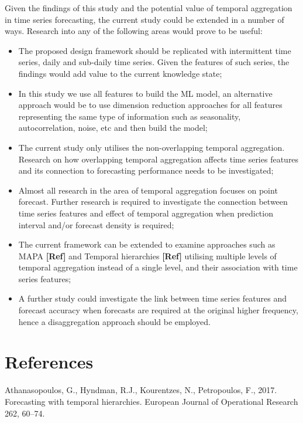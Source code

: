 \documentclass[]{elsarticle} %
\begin{document}
Given the findings of this study and the potential value of temporal
aggregation in time series forecasting, the current study could be
extended in a number of ways. Research into any of the following areas
would prove to be useful:

\begin{itemize}
\item
  The proposed design framework should be replicated with intermittent
  time series, daily and sub-daily time series. Given the features of
  such series, the findings would add value to the current knowledge
  state;
\item
  In this study we use all features to build the ML model, an
  alternative approach would be to use dimension reduction approaches
  for all features representing the same type of information such as
  seasonality, autocorrelation, noise, etc and then build the model;
\item
  The current study only utilises the non-overlapping temporal
  aggregation. Research on how overlapping temporal aggregation affects
  time series features and its connection to forecasting performance
  needs to be investigated;
\item
  Almost all research in the area of temporal aggregation focuses on
  point forecast. Further research is required to investigate the
  connection between time series features and effect of temporal
  aggregation when prediction interval and/or forecast density is
  required;
\item
  The current framework can be extended to examine approaches such as
  MAPA \textbf{{[}Ref{]}} and Temporal hierarchies \textbf{{[}Ref{]}}
  utilising multiple levels of temporal aggregation instead of a single
  level, and their association with time series features;
\item
  A further study could investigate the link between time series
  features and forecast accuracy when forecasts are required at the
  original higher frequency, hence a disaggregation approach should be
  employed.
\end{itemize}

\hypertarget{references}{%
\section*{References}\label{references}}

\hypertarget{refs}{}
\leavevmode\hypertarget{ref-athanasopoulos2017forecasting}{}%
Athanasopoulos, G., Hyndman, R.J., Kourentzes, N., Petropoulos, F.,
2017. Forecasting with temporal hierarchies. European Journal of
Operational Research 262, 60--74.
\end{document}
